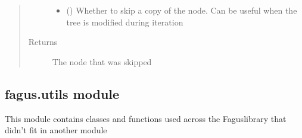 \documentclass[a4paper,10pt,english]{sphinxmanual}
\begin{document}
\begin{fulllineitems}
\begin{fulllineitems}
\begin{quote}
\begin{description}
\begin{itemize}
\item {}
\sphinxAtStartPar
{} () \textendash{} Whether to skip a copy of the node. Can be useful when the tree is modified during iteration

\end{itemize}

\item[{Returns}] \leavevmode
\sphinxAtStartPar
The node that was skipped

\end{description}\end{quote}

\end{fulllineitems}


\end{fulllineitems}


\sphinxstepscope


\subsection{fagus.utils module}
\label{\detokenize{fagus.utils:module-fagus.utils}}\label{\detokenize{fagus.utils:fagus-utils-module}}\label{\detokenize{fagus.utils::doc}}
\sphinxAtStartPar
This module contains classes and functions used across the Fagus\sphinxhyphen{}library that didn’t fit in another module
\end{document}
